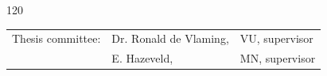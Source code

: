\begin{titlepage}
\begin{center}
\begin{textblock}{120}
\end{textblock}

\vspace{5cm}
\begin{tabular}{l l l}
    Thesis committee: & Dr. Ronald de Vlaming, & VU, supervisor \\
                      & E. Hazeveld, & MN, supervisor \\
\end{tabular}







\setlength{\parindent}{\backupparindent}
\end{center}


\end{titlepage} 
